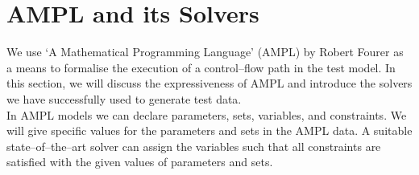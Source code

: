 \documentclass[runningheads,a4paper]{llncs}%
\begin{document}
\section{AMPL and its Solvers}%
\label{sec:AMPL}%
We use `A Mathematical Programming Language' (AMPL) by Robert Fourer \cite{AMPL} as a means to formalise the execution of a control--flow path in the test model. In this section, we will discuss the expressiveness of AMPL and introduce the solvers we have successfully used to generate test data.\\%
In AMPL models we can declare parameters, sets, variables, and constraints. We will give specific values for the parameters and sets in the AMPL data. A suitable state--of--the--art solver can assign the variables such that all constraints are satisfied with the given values of parameters and sets.\\%
\end{document}
